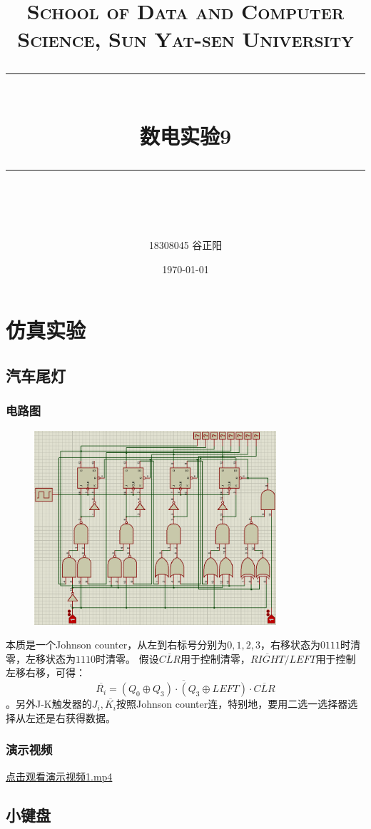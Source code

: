 \documentclass[UTF8, a4paper, 11pt]{article}
\title{	
\normalfont \normalsize
\textsc{School of Data and Computer Science, Sun Yat-sen University} \\ [25pt] %
\rule{\textwidth}{0.5pt} \\[0.4cm] %
\huge 数电实验9\\ %
\rule{\textwidth}{2pt} \\[0.5cm] %
\author{18308045 谷正阳}
\date{\normalsize\today}
}
\begin{document}
\maketitle
\tableofcontents
\newpage
\section{仿真实验}
\subsection{汽车尾灯}
\subsubsection{电路图}
\begin{figure}[H]
    \centering
    \includegraphics[width=0.8\textwidth]{ex10.1电路图.png}
\end{figure}
本质是一个Johnson counter，从左到右标号分别为$0,1,2,3$，右移状态为$0111$时清零，左移状态为$1110$时清零。
假设$\overline{CLR}$用于控制清零，$\overline{RIGHT}/LEFT$用于控制左移右移，可得：
$$\overline{R_i}=\overline{(Q_0\oplus Q_3)\cdot(Q_3\oplus LEFT)}\cdot\overline{CLR}$$
。另外J-K触发器的$J_i,\overline{K_i}$按照Johnson counter连，特别地，要用二选一选择器选择从左还是右获得数据。
\subsubsection{演示视频}
\href{1.mp4}{点击观看演示视频1.mp4}
\subsection{小键盘}
\end{document}
